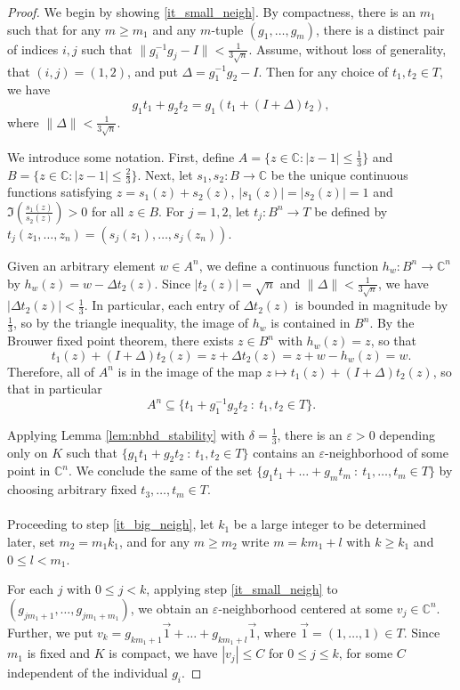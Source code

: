 \documentclass[11pt]{amsart}
\theoremstyle{remark}
\numberwithin{theorem}{section}
\numberwithin{equation}{section}
\newcommand{\C}{\mathbb{C}}
\begin{document}
\begin{proof}
We begin by showing \eqref{it_small_neigh}. By compactness, 
there is an $m_1$ such that for any $m\ge m_1$ and any $m$-tuple
$(g_1, \ldots, g_m)$, there is a distinct pair of indices $i,j$
such that $\| g_i^{-1} g_j - I \| < \frac{1}{3 \sqrt{n}}$.
Assume, without loss of generality, that $(i,j)=(1,2)$, and
put $\Delta = g_1^{-1} g_2 - I$. Then for any choice of $t_1, t_2 \in T$,
we have
\[
g_1 t_1 + g_2 t_2 = g_1 (t_1 + (I + \Delta) t_2),
\]
where $\| \Delta \|<\frac1{3\sqrt{n}}$.

We introduce some notation. First, define $A=\{z\in\C:|z-1|\le\frac13\}$
and $B=\{ z \in \C : |z - 1| \leq \frac{2}{3} \}$.
Next, let $s_1, s_2: B \rightarrow \C$ be the unique continuous
functions satisfying $z = s_1(z) + s_2(z)$,
$|s_1(z)| = |s_2(z)| = 1$ and $\Im(\frac{s_1(z)}{s_2(z)}) > 0$ for all
$z\in B$. For $j=1,2$, let $t_j:B^n\rightarrow T$ be defined by
$t_j(z_1,\ldots,z_n)=(s_j(z_1),\ldots,s_j(z_n))$.

Given an arbitrary element $w\in A^n$,
we define a continuous function $h_w: B^n \rightarrow \C^n$ by
$h_w(z) = w - \Delta{t_2(z)}$.
Since $|t_2(z)|=\sqrt{n}$ and
$\|\Delta\|<\frac1{3\sqrt{n}}$, we have
$|\Delta t_2(z)|<\frac13$.
In particular, each entry of $\Delta t_2(z)$ is bounded in magnitude
by $\frac13$, so by the triangle inequality, the
image of $h_w$ is contained in $B^n$. By the Brouwer fixed point theorem,
there exists $z \in B^n$ with $h_w(z) = z$, so that
\[
t_1(z) + (I + \Delta) t_2(z) = z+\Delta{t_2(z)} = z+w-h_w(z) = w.
\]
Therefore, all of $A^n$ is in the image of the map
$z \mapsto t_1(z) + (I + \Delta) t_2(z)$,
so that in particular
\[
A^n \subseteq \{ t_1 + g_1^{-1} g_2 t_2 \ : \ t_1, t_2 \in T \}.
\]

Applying Lemma \ref{lem:nbhd_stability} with $\delta=\frac13$,
there is an $\varepsilon>0$
depending only on $K$ such that
$\{ g_1 t_1 + g_2 t_2 \ : \ t_1, t_2 \in T \}$ 
contains an $\varepsilon$-neighborhood of some point in $\C^n$.
We conclude the same of the set
$\{ g_1 t_1 + \ldots + g_m t_m \ : \ t_1, \ldots, t_m \in T \}$
by choosing arbitrary fixed $t_3, \ldots, t_m \in T$.
\\
\\
Proceeding to step \eqref{it_big_neigh}, let $k_1$ be a large integer
to be determined later, set $m_2 = m_1 k_1$, and for any $m \geq m_2$ write
$m = k m_1 + l$ 
with $k\ge k_1$ and
$0 \leq l < m_1$.

For each $j$ with $0\leq j<k$, applying step \eqref{it_small_neigh}
to $(g_{jm_1+1},\ldots,g_{jm_1+m_1})$, we obtain an $\varepsilon$-neighborhood
centered at some $v_j\in \C^n$. Further, we put
$v_k = g_{km_1 + 1} \overrightarrow{1} + \ldots
+ g_{k m_1 + l} \overrightarrow{1}$, where
$\overrightarrow{1} = (1, \ldots, 1) \in T$.
Since $m_1$ is fixed and $K$ is compact, 
we have $|v_j| \leq C$ for $0\leq j\leq k$, for some $C$ independent of the individual $g_i$.


\end{proof}
\end{document}
